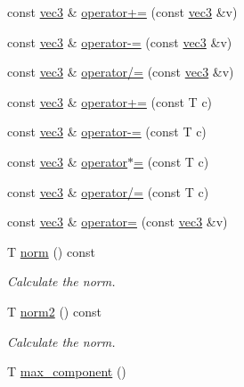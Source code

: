 \begin{DoxyCompactItemize}
const \mbox{\hyperlink{struct_space_h_1_1vec3}{vec3}} \& \mbox{\hyperlink{struct_space_h_1_1vec3_a5a9143627e21c4b343b4ac44a5759cc8}{operator+=}} (const \mbox{\hyperlink{struct_space_h_1_1vec3}{vec3}} \&v)
\item 
const \mbox{\hyperlink{struct_space_h_1_1vec3}{vec3}} \& \mbox{\hyperlink{struct_space_h_1_1vec3_a54124bffc816d8dcf912422647bac6c3}{operator-\/=}} (const \mbox{\hyperlink{struct_space_h_1_1vec3}{vec3}} \&v)
\item 
const \mbox{\hyperlink{struct_space_h_1_1vec3}{vec3}} \& \mbox{\hyperlink{struct_space_h_1_1vec3_a0de32a9762524bf50e592c5a463c29e2}{operator/=}} (const \mbox{\hyperlink{struct_space_h_1_1vec3}{vec3}} \&v)
\item 
const \mbox{\hyperlink{struct_space_h_1_1vec3}{vec3}} \& \mbox{\hyperlink{struct_space_h_1_1vec3_a444d5277ca3ad78b88dbba50d45007f1}{operator+=}} (const T c)
\item 
const \mbox{\hyperlink{struct_space_h_1_1vec3}{vec3}} \& \mbox{\hyperlink{struct_space_h_1_1vec3_a78f7adf1ccf20819b5c9a536762933e0}{operator-\/=}} (const T c)
\item 
const \mbox{\hyperlink{struct_space_h_1_1vec3}{vec3}} \& \mbox{\hyperlink{struct_space_h_1_1vec3_ad4d8983185e2a69b9478c6f2baad2d36}{operator$\ast$=}} (const T c)
\item 
const \mbox{\hyperlink{struct_space_h_1_1vec3}{vec3}} \& \mbox{\hyperlink{struct_space_h_1_1vec3_afd7ec569421aa04734cebdb346b9bdbf}{operator/=}} (const T c)
\item 
const \mbox{\hyperlink{struct_space_h_1_1vec3}{vec3}} \& \mbox{\hyperlink{struct_space_h_1_1vec3_a958945cd614424f1c11daf9397370f6a}{operator=}} (const \mbox{\hyperlink{struct_space_h_1_1vec3}{vec3}} \&v)
\item 
T \mbox{\hyperlink{struct_space_h_1_1vec3_aeec869b0802a468ffff325efb2d0e780}{norm}} () const
\begin{DoxyCompactList}\small\item\em Calculate the norm. \end{DoxyCompactList}\item 
T \mbox{\hyperlink{struct_space_h_1_1vec3_a62dcbdc184d4228da839845c7e179eea}{norm2}} () const
\begin{DoxyCompactList}\small\item\em Calculate the norm. \end{DoxyCompactList}\item 
T \mbox{\hyperlink{struct_space_h_1_1vec3_a5bf7ae47f97a2269748d66933d719bd9}{max\+\_\+component}} ()

\end{DoxyCompactItemize}
